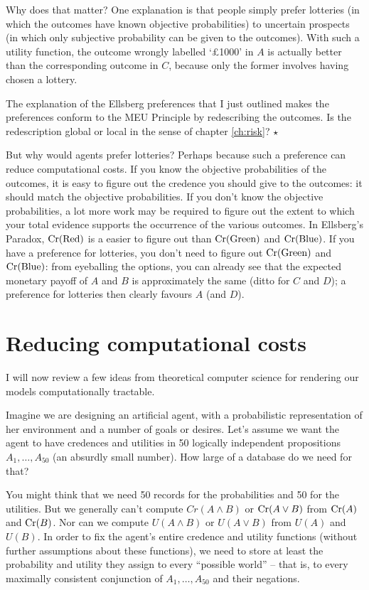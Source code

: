 Why does that matter? One explanation is that people simply prefer
lotteries (in which the outcomes have known objective
probabilities) to uncertain prospects (in which only subjective
probability can be given to the outcomes). With such a utility
function, the outcome wrongly labelled `£1000' in $A$ is actually
better than the corresponding outcome in $C$, because only the former
involves having chosen a lottery.

\begin{exercise}
  The explanation of the Ellsberg preferences that I just outlined
  makes the preferences conform to the MEU Principle by redescribing
  the outcomes. Is the redescription global or local in the sense of
  chapter \ref{ch:risk}? $\star$
\end{exercise}

But why would agents prefer lotteries? Perhaps because such a
preference can reduce computational costs. If you know the objective
probabilities of the outcomes, it is easy to figure out the credence
you should give to the outcomes: it should match the objective
probabilities. If you don't know the objective probabilities, a lot
more work may be required to figure out the extent to which your total
evidence supports the occurrence of the various outcomes. In
Ellsberg's Paradox, $\text{Cr}(\text{Red})$ is a easier to figure out than
$\text{Cr}(\text{Green})$ and $\text{Cr}(\text{Blue})$. If you have a preference
for lotteries, you don't need to figure out $\text{Cr}(\text{Green})$ and
$\text{Cr}(\text{Blue})$: from eyeballing the options, you can already see
that the expected monetary payoff of $A$ and $B$ is approximately the
same (ditto for $C$ and $D$); a preference for lotteries then clearly
favours $A$ (and $D$).


\section{Reducing computational costs}

I will now review a few ideas from theoretical computer science for
rendering our models computationally tractable.

Imagine we are designing an artificial agent, with a probabilistic
representation of her environment and a number of goals or
desires. Let's assume we want the agent to have credences and
utilities in 50 logically independent propositions
$A_1,\ldots,A_{50}$ (an absurdly small number).
How large of a database do we need for that?

You might think that we need 50 records for the probabilities and 50
for the utilities. But we generally can't compute $Cr(A \land B)$ or
$\text{Cr}(A \lor B)$ from $\text{Cr}(A)$ and $\text{Cr}(B)$. Nor can we compute $U(A
\land B)$ or $U(A \lor B)$ from $U(A)$ and $U(B)$. In order to fix the
agent's entire credence and utility functions (without further
assumptions about these functions), we need to store at least the
probability and utility they assign to every ``possible world'' --
that is, to every maximally consistent conjunction of
$A_1,\ldots,A_{50}$ and their negations.

